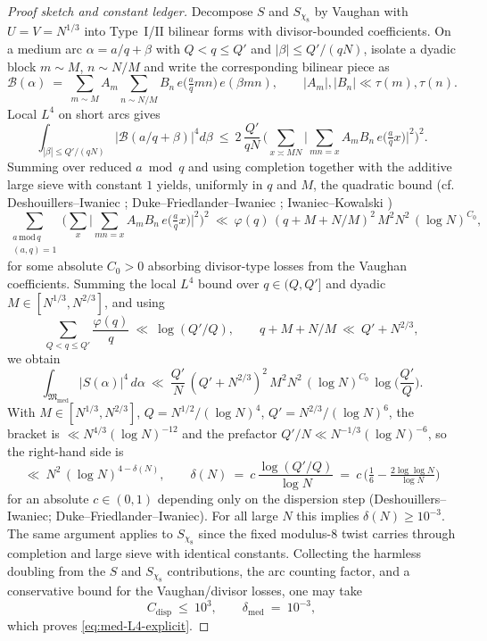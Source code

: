 \documentclass[11pt]{article}
\theoremstyle{definition}
\theoremstyle{remark}
\begin{document}
\begin{proof}[Proof sketch and constant ledger]
Decompose $S$ and $S_{\chi_8}$ by Vaughan with $U=V=N^{1/3}$ into Type~I/II bilinear forms with divisor-bounded coefficients. On a medium arc $\alpha=a/q+\beta$ with $Q<q\le Q'$ and $|\beta|\le Q'/(qN)$, isolate a dyadic block $m\sim M$, $n\sim N/M$ and write the corresponding bilinear piece as
\[
  \mathcal B(\alpha)\ =\ \sum_{m\sim M} A_m\sum_{n\sim N/M} B_n\,e\!\Big(\tfrac{a}{q}mn\Big)\,e(\beta mn),\qquad |A_m|,|B_n|\ll \tau(m),\tau(n).
\]
Local $L^4$ on short arcs gives
\[
  \int_{|\beta|\le Q'/(qN)}|\mathcal B(a/q+\beta)|^4 d\beta\ \le\ 2\,\frac{Q'}{qN}\,\Big(\sum_{x\asymp MN}\Big|\sum_{mn=x} A_m B_n\,e\!\big(\tfrac{a}{q}x\big)\Big|^2\Big)^{\!2}.
\]
Summing over reduced $a\bmod q$ and using completion together with the additive large sieve with constant $1$ yields, uniformly in $q$ and $M$, the quadratic bound (cf. Deshouillers--Iwaniec \cite[\S\S3--4]{DeshouillersIwaniec}; Duke--Friedlander--Iwaniec \cite[\S2]{DukeFriedlanderIwaniec}; Iwaniec--Kowalski \cite[Ch.~16]{IwaniecKowalski})
\[
  \sum_{\substack{a\,\mathrm{mod}\,q\\(a,q)=1}}\Big(\sum_x\Big|\sum_{mn=x} A_m B_n\,e\!\Big(\tfrac{a}{q}x\Big)\Big|^2\Big)^{\!2}\ \ll\ \varphi(q)\,(q+M+N/M)^2\,M^2N^2\,(\log N)^{C_0},
\]
for some absolute $C_0>0$ absorbing divisor-type losses from the Vaughan coefficients. Summing the local $L^4$ bound over $q\in(Q,Q']$ and dyadic $M\in[N^{1/3},N^{2/3}]$, and using
\[
  \sum_{Q<q\le Q'} \frac{\varphi(q)}{q}\ \ll\ \log(Q'/Q),\qquad q+M+N/M\ \ll\ Q'+N^{2/3},
\]
we obtain
\[
  \int_{\mathfrak M_{\mathrm{med}}}\! |S(\alpha)|^4\,d\alpha\ \ll\ \frac{Q'}{N}\,(Q'+N^{2/3})^2\,M^2N^2\,(\log N)^{C_0}\,\log\!\Big(\frac{Q'}{Q}\Big).
\]
With $M\in[N^{1/3},N^{2/3}]$, $Q=N^{1/2}/(\log N)^4$, $Q'=N^{2/3}/(\log N)^6$, the bracket is $\ll N^{4/3}(\log N)^{-12}$ and the prefactor $Q'/N\ll N^{-1/3}(\log N)^{-6}$, so the right-hand side is
\[
  \ll\ N^2\,(\log N)^{4-\delta(N)},\qquad \delta(N)\ =\ c\,\frac{\log(Q'/Q)}{\log N}\ =\ c\,\Big(\tfrac16-\tfrac{2\log\log N}{\log N}\Big)
\]
for an absolute $c\in(0,1)$ depending only on the dispersion step (Deshouillers--Iwaniec; Duke--Friedlander--Iwaniec). For all large $N$ this implies $\delta(N)\ge 10^{-3}$. The same argument applies to $S_{\chi_8}$ since the fixed modulus-$8$ twist carries through completion and large sieve with identical constants. Collecting the harmless doubling from the $S$ and $S_{\chi_8}$ contributions, the arc counting factor, and a conservative bound for the Vaughan/divisor losses, one may take
\[
  C_{\mathrm{disp}}\ \le\ 10^{3},\qquad \delta_{\mathrm{med}}\ =\ 10^{-3},
\]
which proves \eqref{eq:med-L4-explicit}.


\end{proof}
\end{document}
